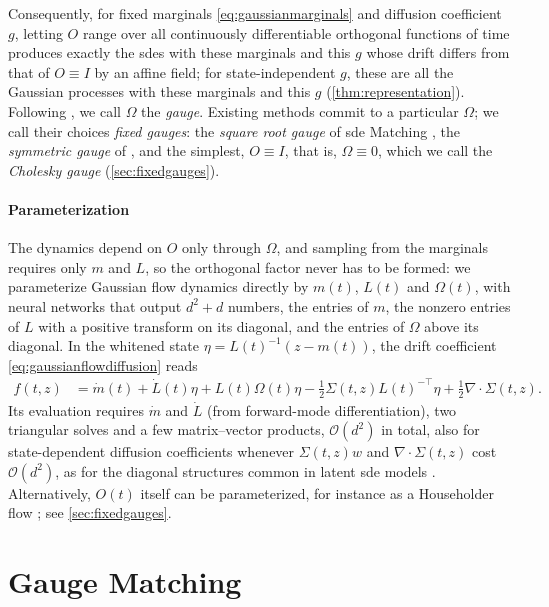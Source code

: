 \documentclass{article} %
\newcommand{\postdrift}{f}
\newcommand{\vol}{g}
\newcommand{\gauge}{\Omega}
\begin{document}
Consequently, for fixed marginals \cref{eq:gaussianmarginals} and diffusion coefficient $\vol$, letting $O$ range over all continuously differentiable orthogonal functions of time produces exactly the \glspl{sde} with these marginals and this $\vol$ whose drift differs from that of $O \equiv I$ by an affine field; for state-independent $\vol$, these are all the Gaussian processes with these marginals and this $\vol$ (\cref{thm:representation}). Following \citet{smith2026closing}, we call $\gauge$ the \emph{gauge}. Existing methods commit to a particular $\gauge$; we call their choices \emph{fixed gauges}: the \emph{square root gauge} of \gls{sde} Matching \citep{bartosh2025sde}, the \emph{symmetric gauge} of \citet{course2023amortized}, and the simplest, $O \equiv I$, that is, $\gauge \equiv 0$, which we call the \emph{Cholesky gauge} (\cref{sec:fixedgauges}).

\paragraph{Parameterization}
The dynamics depend on $O$ only through $\gauge$, and sampling from the marginals requires only $m$ and $L$, so the orthogonal factor never has to be formed: we parameterize Gaussian flow dynamics directly by $m(t)$, $L(t)$ and $\gauge(t)$, with neural networks that output $d^2 + d$ numbers, the entries of $m$, the nonzero entries of $L$ with a positive transform on its diagonal, and the entries of $\gauge$ above its diagonal. In the whitened state $\eta = L(t)^{-1}(z - m(t))$, the drift coefficient \cref{eq:gaussianflowdiffusion} reads
\begin{align}
    \postdrift(t, z) &= \dot m(t) + \dot L(t) \eta + L(t) \gauge(t) \eta - \frac{1}{2} \Sigma(t, z) L(t)^{-\top} \eta + \frac{1}{2} \nabla \cdot \Sigma(t, z).
    \label{eq:driftwhitened}
\end{align}
Its evaluation requires $\dot m$ and $\dot L$ (from forward-mode differentiation), two triangular solves and a few matrix--vector products, $\mathcal{O}(d^2)$ in total, also for state-dependent diffusion coefficients whenever $\Sigma(t, z) w$ and $\nabla \cdot \Sigma(t, z)$ cost $\mathcal{O}(d^2)$, as for the diagonal structures common in latent \gls{sde} models \citep{li2020scalable,bartosh2025sde}. Alternatively, $O(t)$ itself can be parameterized, for instance as a Householder flow \citep{tomczak2016improving}; see \cref{sec:fixedgauges}.

\section{Gauge Matching}
\label{sec:gaugematching}
\end{document}
